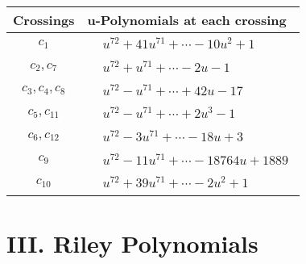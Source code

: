 \documentclass[1p]{elsarticle_modified}
\theoremstyle{definition}
\begin{document}
\begin{tabular}{m{50pt}|m{274pt}}
Crossings & \hspace{64pt}u-Polynomials at each crossing \\
\hline $$\begin{aligned}c_{1}\end{aligned}$$&$\begin{aligned}
&u^{72}+41 u^{71}+\cdots-10 u^2+1
\end{aligned}$\\
\hline $$\begin{aligned}c_{2},c_{7}\end{aligned}$$&$\begin{aligned}
&u^{72}+u^{71}+\cdots-2 u-1
\end{aligned}$\\
\hline $$\begin{aligned}c_{3},c_{4},c_{8}\end{aligned}$$&$\begin{aligned}
&u^{72}- u^{71}+\cdots+42 u-17
\end{aligned}$\\
\hline $$\begin{aligned}c_{5},c_{11}\end{aligned}$$&$\begin{aligned}
&u^{72}- u^{71}+\cdots+2 u^3-1
\end{aligned}$\\
\hline $$\begin{aligned}c_{6},c_{12}\end{aligned}$$&$\begin{aligned}
&u^{72}-3 u^{71}+\cdots-18 u+3
\end{aligned}$\\
\hline $$\begin{aligned}c_{9}\end{aligned}$$&$\begin{aligned}
&u^{72}-11 u^{71}+\cdots-18764 u+1889
\end{aligned}$\\
\hline $$\begin{aligned}c_{10}\end{aligned}$$&$\begin{aligned}
&u^{72}+39 u^{71}+\cdots-2 u^2+1
\end{aligned}$\\
\hline
\end{tabular}\newpage\renewcommand{\arraystretch}{1}
\centering \section*{ III. Riley Polynomials}
\end{document}
